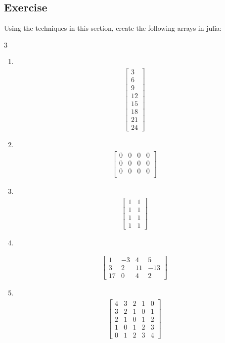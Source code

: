  
 \subsection{Exercise}

Using the techniques in this section, create the following arrays in julia:
\begin{multicols}{3}
\begin{enumerate}
\item ~
\begin{align*}
\begin{bmatrix}
3 \\ 6 \\ 9 \\ 12 \\ 15 \\ 18 \\ 21 \\ 24
\end{bmatrix}
\end{align*}
\columnbreak
\item ~
\begin{align*}
\begin{bmatrix}
0 & 0 & 0 & 0 \\
0 & 0 & 0 & 0 \\
0 & 0 & 0 & 0 \\
\end{bmatrix}
\end{align*}

\item ~
\begin{align*}
\begin{bmatrix}
1 & 1 \\
1 & 1 \\
1 & 1 \\
1 & 1
\end{bmatrix}
\end{align*}


\columnbreak

\item ~

\begin{align*}
\begin{bmatrix}
1 & -3 & 4 & 5 \\
3 & 2 & 11 & -13 \\
17 & 0 & 4 & 2
\end{bmatrix}
\end{align*}

\item ~
\begin{align*}
\begin{bmatrix}
4 & 3 & 2 & 1 & 0 \\
3 & 2 & 1 & 0 & 1 \\
2 & 1 & 0 & 1 & 2 \\
1 & 0 & 1 & 2 & 3 \\
0 & 1 & 2 & 3 & 4 
\end{bmatrix}
\end{align*}

\end{enumerate}
\end{multicols}

